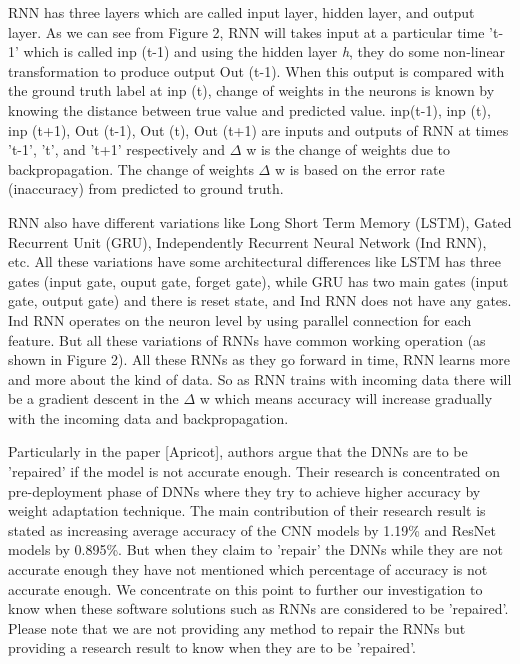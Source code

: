 \documentclass[sigconf,authordraft]{acmart}
\begin{document}
 RNN has three layers which are called input layer, hidden layer, and output layer. As we can see from Figure 2, RNN will takes input at a particular time 't-1' which is called inp (t-1) and using the hidden layer \emph{h}, they do some non-linear transformation to produce output Out (t-1). When this output is compared with the ground truth label at inp (t), change of weights in the neurons is known by knowing the distance between true value and predicted value. inp(t-1), inp (t), inp (t+1), Out (t-1), Out (t), Out (t+1) are inputs and outputs of RNN at times 't-1', 't', and 't+1' respectively and \begin{math}\Delta \end{math} w is the change of weights due to backpropagation. The change of weights \begin{math}\Delta \end{math} w is based on the error rate (inaccuracy) from predicted to ground truth.
 
RNN also have different variations like Long Short Term Memory (LSTM), Gated Recurrent Unit (GRU), Independently Recurrent Neural Network (Ind RNN), etc. All these variations have some architectural differences like LSTM has three gates (input gate, ouput gate, forget gate), while GRU has two main gates (input gate, output gate) and there is reset state, and Ind RNN does not have any gates. Ind RNN operates on the neuron level by using parallel connection for each feature. But all these variations of RNNs have common working operation (as shown in Figure 2). All these RNNs as they go forward in time, RNN learns more and more about the kind of data. So as RNN trains with incoming data there will be a gradient descent in the \begin{math}\Delta \end{math} w which means accuracy will increase gradually with the incoming data and backpropagation.
 

Particularly in the paper [Apricot], authors argue that the DNNs are to be 'repaired' if the model is not accurate enough. Their research is concentrated on pre-deployment phase of DNNs where they try to achieve higher accuracy by weight adaptation technique. The main contribution of their research result is stated as increasing average accuracy of the CNN models by 1.19\% and ResNet models by 0.895\%. But when they claim to 'repair' the DNNs while they are not accurate enough they have not mentioned which percentage of accuracy is not accurate enough. We concentrate on this point to further our investigation to know when these software solutions such as RNNs are considered to be 'repaired'. Please note that we are not providing any method to repair the RNNs but providing a research result to know when they are to be 'repaired'. 
\end{document}
